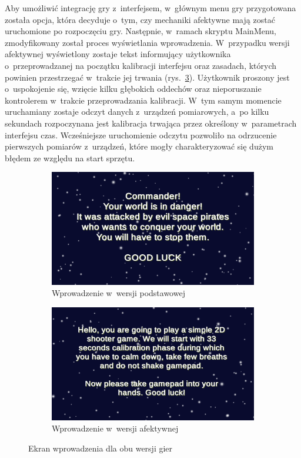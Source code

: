 Aby umożliwić integrację gry z~interfejsem, w~głównym menu gry przygotowana została opcja, która decyduje o~tym, czy mechaniki afektywne mają zostać uruchomione po rozpoczęciu gry. Następnie, w~ramach skryptu MainMenu, zmodyfikowany został proces wyświetlania wprowadzenia. W~przypadku wersji afektywnej wyświetlony zostaje tekst informujący użytkownika o~przeprowadzanej na początku kalibracji interfejsu oraz zasadach, których powinien przestrzegać w~trakcie jej trwania (rys.~\ref{fig:introductions}). Użytkownik proszony jest o~uspokojenie się, wzięcie kilku głębokich oddechów oraz nieporuszanie kontrolerem w~trakcie przeprowadzania kalibracji. W~tym samym momencie uruchamiany zostaje odczyt danych z~urządzeń pomiarowych, a~po kilku sekundach rozpoczynana jest kalibracja trwająca przez określony w~parametrach interfejsu czas. Wcześniejsze uruchomienie odczytu pozwoliło na odrzucenie pierwszych pomiarów z~urządzeń, które mogły charakteryzować się dużym błędem ze względu na start sprzętu.
\begin{figure}
	\begin{subfigure}{0.5\textwidth}
		\centering
		\includegraphics[width=0.9\linewidth]{images/nonaffectiveintroduction.png}
		\caption{Wprowadzenie w~wersji podstawowej}
		\label{fig:nonaffectiveintroduction}
	\end{subfigure}%
	\begin{subfigure}{0.5\textwidth}
		\centering
		\includegraphics[width=0.9\linewidth]{images/affectiveintroduction.png}
		\caption{Wprowadzenie w~wersji afektywnej}
		\label{fig:affectiveintroduction}
	\end{subfigure}
	\caption{Ekran wprowadzenia dla obu wersji gier}
	\label{fig:introductions}
\end{figure}

